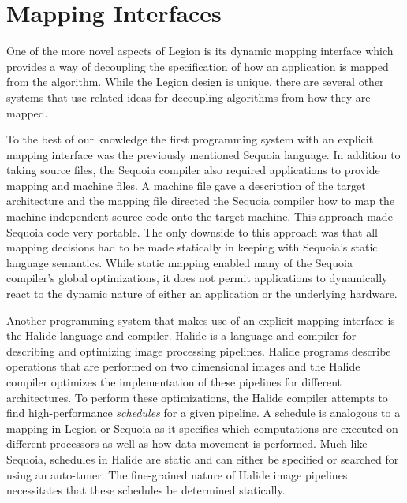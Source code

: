 
\section{Mapping Interfaces}
\label{sec:maprelate}

One of the more novel aspects of Legion is its
dynamic mapping interface which provides a way
of decoupling the specification of how an application
is mapped from the algorithm. While the Legion
design is unique, there are several other systems
that use related ideas for decoupling algorithms
from how they are mapped.

To the best of our knowledge the first programming
system with an explicit mapping interface was
the previously mentioned Sequoia language\cite{Sequoia06}.
In addition to taking source files, the Sequoia
compiler also required applications to provide
mapping and machine files.  A machine file gave
a description of the target architecture and the
mapping file directed the Sequoia compiler how to
map the machine-independent source code onto the
target machine. This approach made Sequoia code
very portable. The only downside to this approach
was that all mapping decisions had to be made
statically in keeping with Sequoia's static
language semantics. While static mapping enabled
many of the Sequoia compiler's global optimizations, 
it does not permit applications to dynamically react
to the dynamic nature of either an application
or the underlying hardware.

Another programming system that makes use of an
explicit mapping interface is the Halide language
and compiler\cite{Halide13}. Halide is a language
and compiler for describing and optimizing image
processing pipelines. Halide programs describe
operations that are performed on two dimensional
images and the Halide compiler optimizes the
implementation of these pipelines for different
architectures.  To perform these optimizations,
the Halide compiler attempts to find high-performance
{\em schedules} for a given pipeline. A schedule
is analogous to a mapping in Legion or Sequoia as
it specifies which computations are executed on
different processors as well as how data movement
is performed. Much like Sequoia, schedules in Halide 
are static and can either be specified or searched 
for using an auto-tuner. The fine-grained nature
of Halide image pipelines necessitates that these
schedules be determined statically.

